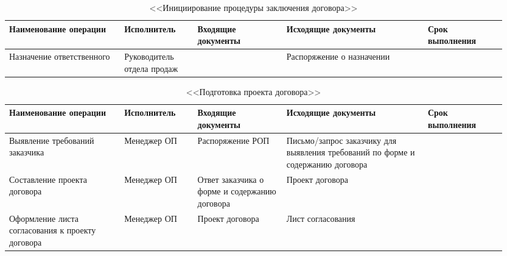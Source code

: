 \documentclass[a4paper,14pt]{extarticle}
\begin{document}
\newpage
\begin{landscape}
	

\begin{table}[h!]
\small
	\begin{center}
		\begin{tabular}{|p{0.22\linewidth}|p{0.14\linewidth}|p{0.17\linewidth}|p{0.27\linewidth}|p{0.15\linewidth}|}
		\hline
		\textbf{Наименование операции} & \textbf{Исполнитель} & \textbf{Входящие}
		\textbf{документы} & \textbf{Исходящие} \textbf{документы} & \textbf{Срок}
		\textbf{выполнения} \\
		\hline
		Назначение
		ответственного & Руководитель
		отдела
		продаж &  & Распоряжение о
		назначении &  \\
		\hline
		\end{tabular}
	\end{center}
		\caption{<<Инициирование
			процедуры
			заключения договора>>}
		\label{}
\end{table}
	
	
	\begin{table}[h!]
		\small
		\begin{center}
			\begin{tabular}{|p{0.22\linewidth}|p{0.14\linewidth}|p{0.17\linewidth}|p{0.27\linewidth}|p{0.15\linewidth}|}
				\hline
				\textbf{Наименование операции} & \textbf{Исполнитель} & \textbf{Входящие документы} & \textbf{Исходящие документы} & \textbf{Срок выполнения} \\ \hline
				Выявление требований заказчика & Менеджер ОП & Распоряжение РОП  & Письмо/запрос   заказчику  для выявления  требований по форме и содержанию договора &  \\ \hline
				Составление проекта договора & Менеджер ОП & Ответ  заказчика о форме и содержанию договора & Проект договора &  \\ \hline
				Оформление листа согласования к проекту договора & Менеджер ОП & Проект договора &  Лист согласования &  \\ \hline
			\end{tabular}
		\end{center}
	\caption{<<Подготовка проекта договора>>}
		\label{}
	\end{table}
\newpage
{}
	

\end{landscape}
\end{document}

